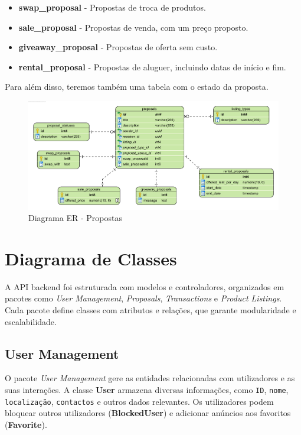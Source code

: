 \documentclass[a4paper, 12pt]{article} %
\begin{document}
\begin{itemize}
	\item \textbf{swap\_proposal} - Propostas de troca de produtos.
	\item \textbf{sale\_proposal} - Propostas de venda, com um preço proposto.
	\item \textbf{giveaway\_proposal} - Propostas de oferta sem custo.
	\item \textbf{rental\_proposal} - Propostas de aluguer, incluindo datas de início e fim.
\end{itemize}

Para além disso, teremos também uma tabela com o estado da proposta.

\begin{figure}[H]
	\centering
	\includegraphics[width=\textwidth]{../images/entity-relationship-proposals.png}
	\caption{Diagrama ER - Propostas}
	\label{fig:ER Proposals}
\end{figure}


\clearpage
\newpage
\section{Diagrama de Classes}

A API backend foi estruturada com modelos e controladores, organizados em pacotes como \textit{User Management}, \textit{Proposals}, \textit{Transactions} e \textit{Product Listings}. Cada pacote define classes com atributos e relações, que garante modularidade e escalabilidade.

\subsection{User Management}
O pacote \textit{User Management} gere as entidades relacionadas com utilizadores e as suas interações. A classe \textbf{User} armazena diversas informações, como \verb*|ID|, \verb*|nome|, \verb*|localização|, \verb*|contactos| e outros dados relevantes. Os utilizadores podem bloquear outros utilizadores (\textbf{BlockedUser}) e adicionar anúncios aos favoritos (\textbf{Favorite}).
\end{document}
